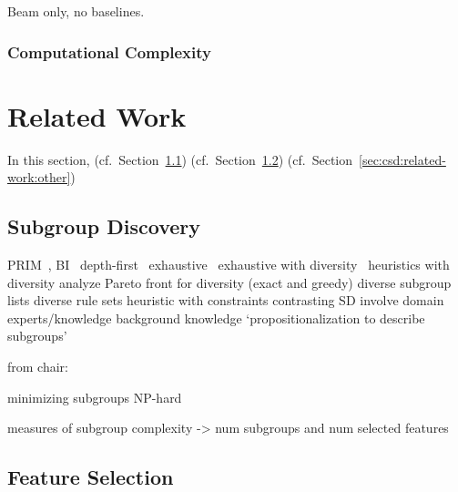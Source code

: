 \documentclass{article}
\theoremstyle{definition}
\begin{document}
Beam only, no baselines.

\subsubsection{Computational Complexity}
\label{sec:csd:approach:alternatives:complexity}

\section{Related Work}
\label{sec:csd:related-work}

In this section, (cf.~Section~\ref{sec:csd:related-work:subgroup-discovery}) (cf.~Section~\ref{sec:csd:related-work:feature-selection})
(cf.~Section~\ref{sec:csd:related-work:other})

\subsection{Subgroup Discovery}
\label{sec:csd:related-work:subgroup-discovery}

PRIM~\cite{friedman1999bump}, BI~\cite{mampaey2012efficient}
depth-first~\cite{millot2020optimal}
exhaustive~\cite{atzmueller2006sd, atzmueller2009fast, grosskreutz2009subgroup, lemmerich2016fast}
exhaustive with diversity~\cite{bosc2018anytime, lemmerich2010fast}
heuristics with diversity \cite{leeuwen2012diverse, lucas2018ssdp+, proencca2022robust}
analyze Pareto front for diversity (exact and greedy) \cite{leeuwen2013discovering}
diverse subgroup lists \cite{lopez2023discovering, lopez2023novel}
diverse rule sets \cite{zhang2020diverse}
heuristic with constraints \cite{lavravc2006relevancy}
contrasting SD \cite{langohr2013contrasting}
involve domain experts/knowledge \cite{dzyuba2013interactive, gamberger2002expert, lemmerich2011local}
background knowledge \cite{atzmueller2005exploiting, atzmueller2006methodological}
`propositionalization to describe subgroups' \cite{zelezny2006propositionalization}

from chair: \cite{arzamasov2021reds} \cite{arzamasov2022pedagogical} \cite{vollmer2019informative}

minimizing subgroups NP-hard~\cite{boley2009non}

measures of subgroup complexity \cite{helal2016subgroup, herrera2011overview, ventura2018subgroup} -> num subgroups and num selected features

\subsection{Feature Selection}
\label{sec:csd:related-work:feature-selection}
\end{document}
